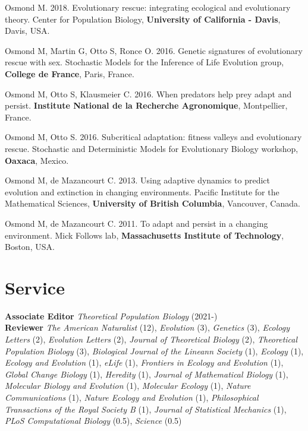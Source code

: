 \documentclass[12pt]{article}
\begin{document}
Osmond M. 2018. Evolutionary rescue: integrating ecological and evolutionary theory. Center for Population Biology, \textbf{University of California - Davis}, Davis, USA. 

Osmond M, Martin G, Otto S, Ronce O. 2016. Genetic signatures of evolutionary rescue with sex. Stochastic Models for the Inference of Life Evolution group, \textbf{College de France}, Paris, France. 

Osmond M, Otto S, Klausmeier C. 2016. When predators help prey adapt and persist. \textbf{Institute National de la Recherche Agronomique}, Montpellier, France. 

Osmond M, Otto S. 2016. Subcritical adaptation: fitness valleys and evolutionary rescue. Stochastic and Deterministic Models for Evolutionary Biology workshop, \textbf{Oaxaca}, Mexico. 


Osmond M, de Mazancourt C. 2013. Using adaptive dynamics to predict evolution and extinction in changing environments. Pacific Institute for the Mathematical Sciences, \textbf{University of British Columbia}, Vancouver, Canada.


Osmond M, de Mazancourt C. 2011. To adapt and persist in a changing environment. Mick Follows lab, \textbf{Massachusetts Institute of Technology}, Boston, USA.

\section*{Service}

\noindent \textbf{Associate Editor} \textit{Theoretical Population Biology} (2021-)\\
\noindent \textbf{Reviewer} \textit{The American Naturalist} (12), \textit{Evolution} (3), \textit{Genetics} (3), \textit{Ecology Letters} (2), \textit{Evolution Letters} (2), \textit{Journal of Theoretical Biology} (2), \textit{Theoretical Population Biology} (3), \textit{Biological Journal of the Lineann Society} (1), \textit{Ecology} (1), \textit{Ecology and Evolution} (1), \textit{eLife} (1), \textit{Frontiers in Ecology and Evolution} (1), \textit{Global Change Biology} (1), \textit{Heredity} (1), \textit{Journal of Mathematical Biology} (1), \textit{Molecular Biology and Evolution} (1), \textit{Molecular Ecology} (1), \textit{Nature Communications} (1), \textit{Nature Ecology and Evolution} (1), \textit{Philosophical Transactions of the Royal Society B} (1), \textit{Journal of Statistical Mechanics} (1), \textit{PLoS Computational Biology} (0.5), \textit{Science} (0.5)
\end{document}
